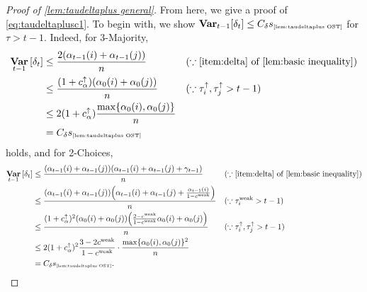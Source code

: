 \documentclass[letterpaper,11pt]{article}
\DeclareMathOperator*{\Var}{\mathbf{Var}}
\newcommand{\varianceref}[1]{\variance_{\mbox{\tiny\ref{#1}}}}
\newcommand{\alphanorm}{\gamma}
\newcommand{\cweak}{c^{\mathrm{weak}}}
\newcommand{\calphaup}{c^{\uparrow}_\alpha}
\newcommand{\variance}{s}
\newcommand{\tauiup}{\tau^{\uparrow}_i}
\newcommand{\tauiweak}{\tau^{\mathrm{weak}}_i}
\newcommand{\taujup}{\tau^{\uparrow}_j}
\newcommand{\Cdeltavarplus}{C_{\delta}}
\begin{document}
\begin{proof}[Proof of \cref{lem:taudeltaplus general}]
    From here, we give a proof of \cref{eq:taudeltaplusc1}.
    To begin with, we show $\Var_{t-1}[\delta_t]\leq \Cdeltavarplus \varianceref{lem:taudeltaplus OST}$ for $\tau>t-1$.
    Indeed, for 3-Majority, 
    \begin{align*}
        \Var_{t-1}\qty[\delta_t]
        &\leq \frac{2(\alpha_{t-1}(i)+\alpha_{t-1}(j))}{n} &&(\because \textrm{\cref{item:delta} of \cref{lem:basic inequality}})\\
        &\leq \frac{(1+\calphaup)(\alpha_{0}(i)+\alpha_{0}(j))}{n} &&(\because \tauiup,\taujup>t-1)\\
        &\leq 2(1+\calphaup)\frac{\max\{\alpha_0(i),\alpha_0(j)\}}{n}\\
        &=\Cdeltavarplus \varianceref{lem:taudeltaplus OST}
    \end{align*}
    holds, and for 2-Choices, 
    \begin{align*}
        \Var_{t-1}\qty[\delta_t]
        &\leq \frac{(\alpha_{t-1}(i)+\alpha_{t-1}(j))(\alpha_{t-1}(i)+\alpha_{t-1}(j)+\alphanorm_{t-1})}{n} &&(\because \textrm{\cref{item:delta} of \cref{lem:basic inequality}})\\
        &\leq \frac{(\alpha_{t-1}(i)+\alpha_{t-1}(j))\qty(\alpha_{t-1}(i)+\alpha_{t-1}(j)+\frac{\alpha_{t-1}(i)}{1-\cweak})}{n}&&(\because \tauiweak>t-1)\\
        &\leq \frac{(1+\calphaup)^2(\alpha_{0}(i)+\alpha_{0}(j))\qty(\frac{2-\cweak}{1-\cweak}\alpha_{0}(i)+\alpha_{0}(j))}{n} &&(\because \tauiup,\taujup>t-1)\\
        &\leq 2(1+\calphaup)^2\frac{3-2\cweak}{1-\cweak} \cdot \frac{\max\{\alpha_0(i),\alpha_0(j)\}^2}{n}\\
        &=\Cdeltavarplus\varianceref{lem:taudeltaplus OST}.
    \end{align*}
    

\end{proof}
\end{document}
